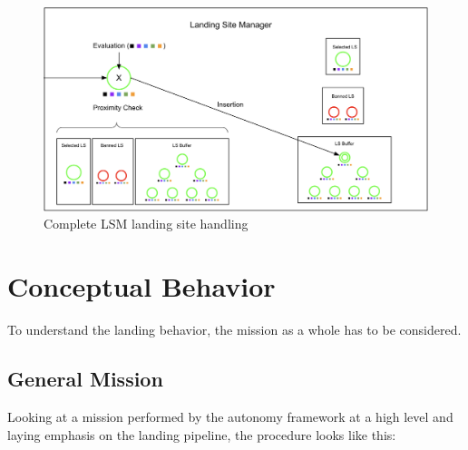 \begin{figure}[h]
\centering
\includegraphics[scale=0.2]{images/autonomous_landing/lsm_complete.png}
\caption{Complete LSM landing site handling}
\label{fig:lsm_complete}
\end{figure}

\section{Conceptual Behavior}\label{sec:concept_beh}

To understand the landing behavior, the mission as a whole has to be considered.

\subsection{General Mission}

Looking at a mission performed by the autonomy framework at a high level and laying emphasis on the landing pipeline, the procedure looks like this:

